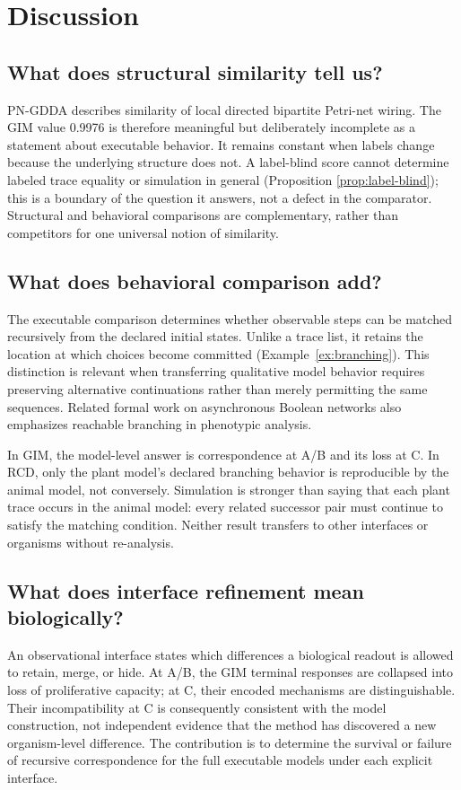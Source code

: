 \section{Discussion}\label{sec:discussion}

\subsection{What does structural similarity tell us?}
PN-GDDA describes similarity of local directed bipartite Petri-net wiring.
The GIM value 0.9976 is therefore meaningful but deliberately incomplete as a
statement about executable behavior. It remains constant when labels change
because the underlying structure does not. A label-blind score cannot determine
labeled trace equality or simulation in general (Proposition
\ref{prop:label-blind}); this is a boundary of the question it answers, not a
defect in the comparator. Structural and behavioral comparisons are
complementary, rather than competitors for one universal notion of similarity.

\subsection{What does behavioral comparison add?}
The executable comparison determines whether observable steps can be matched
recursively from the declared initial states. Unlike a trace list, it retains
the location at which choices become committed (Example~\ref{ex:branching}).
This distinction is relevant when transferring qualitative model behavior
requires preserving alternative continuations rather than merely permitting
the same sequences. Related formal work on asynchronous Boolean networks also
emphasizes reachable branching in phenotypic analysis.\cite{Yizengaw2026}

In GIM, the model-level answer is correspondence at A/B and its loss at C.
In RCD, only the plant model's declared branching behavior is reproducible by
the animal model, not conversely. Simulation is stronger than saying that
each plant trace occurs in the animal model: every related successor pair
must continue to satisfy the matching condition. Neither result transfers to
other interfaces or organisms without re-analysis.

\subsection{What does interface refinement mean biologically?}
An observational interface states which differences a biological readout is
allowed to retain, merge, or hide. At A/B, the GIM terminal responses are
collapsed into loss of proliferative capacity; at C, their encoded mechanisms
are distinguishable. Their incompatibility at C is consequently consistent
with the model construction, not independent evidence that the method has
discovered a new organism-level difference. The contribution is to determine
the survival or failure of recursive correspondence for the full executable
models under each explicit interface.

